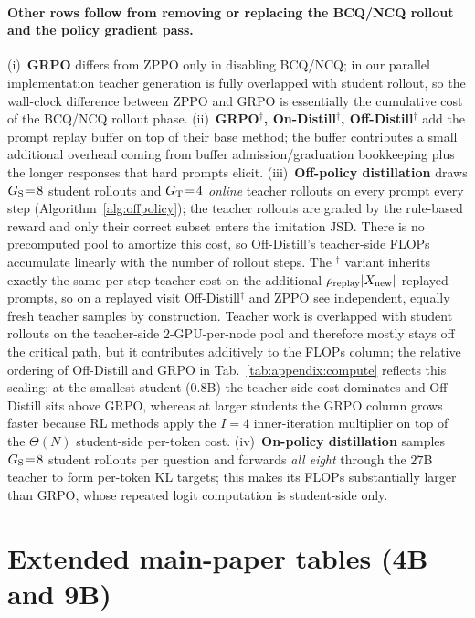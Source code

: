 \documentclass{llmxive}
\begin{document}
\paragraph{Other rows follow from removing or replacing the BCQ/NCQ rollout and the policy gradient pass.} (i)~\textbf{GRPO} differs from ZPPO only in disabling BCQ/NCQ; in our parallel implementation teacher generation is fully overlapped with student rollout, so the wall-clock difference between ZPPO and GRPO is essentially the cumulative cost of the BCQ/NCQ rollout phase. (ii)~\textbf{GRPO$^{\dagger}$, On-Distill$^{\dagger}$, Off-Distill$^{\dagger}$} add the prompt replay buffer on top of their base method; the buffer contributes a small additional overhead coming from buffer admission/graduation bookkeeping plus the longer responses that hard prompts elicit. (iii)~\textbf{Off-policy distillation} draws $G_{\rm S}\!=\!8$ student rollouts and $G_{\rm T}\!=\!4$ \emph{online} teacher rollouts on every prompt every step (Algorithm~\ref{alg:offpolicy}); the teacher rollouts are graded by the rule-based reward and only their correct subset enters the imitation JSD. There is no precomputed pool to amortize this cost, so Off-Distill's teacher-side FLOPs accumulate linearly with the number of rollout steps. The $^{\dagger}$ variant inherits exactly the same per-step teacher cost on the additional $\rho_{\rm replay}|X_{\rm new}|$ replayed prompts, so on a replayed visit Off-Distill$^{\dagger}$ and ZPPO see independent, equally fresh teacher samples by construction. Teacher work is overlapped with student rollouts on the teacher-side $2$-GPU-per-node pool and therefore mostly stays off the critical path, but it contributes additively to the FLOPs column; the relative ordering of Off-Distill and GRPO in Tab.~\ref{tab:appendix:compute} reflects this scaling: at the smallest student ($0.8$B) the teacher-side cost dominates and Off-Distill sits above GRPO, whereas at larger students the GRPO column grows faster because RL methods apply the $I\!=\!4$ inner-iteration multiplier on top of the $\Theta(N)$ student-side per-token cost. (iv)~\textbf{On-policy distillation} samples $G_{\rm S}\!=\!8$ student rollouts per question and forwards \emph{all eight} through the $27$B teacher to form per-token KL targets; this makes its FLOPs substantially larger than GRPO, whose repeated logit computation is student-side only.

\section{Extended main-paper tables (4B and 9B)}
\label{sec:appendix:main_tables}
\end{document}
